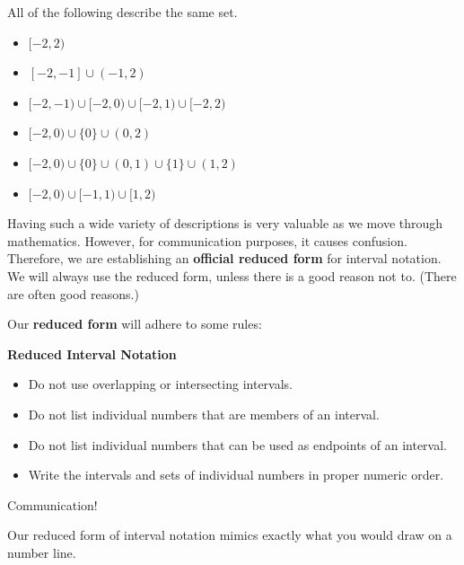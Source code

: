 \documentclass{ximera}
\begin{document}
\hfill\break

All of the following describe the same set.

\begin{itemize}
\item $[-2, 2)$
\item $[-2, -1] \cup (-1, 2)$
\item $[-2, -1) \cup [-2, 0) \cup [-2, 1) \cup [-2, 2)$
\item $[-2, 0) \cup \{ 0 \} \cup (0, 2)$
\item $[-2, 0) \cup \{ 0 \} \cup (0, 1) \cup \{ 1 \} \cup (1, 2)$
\item $[-2, 0) \cup [-1, 1) \cup [1, 2)$
\end{itemize}

Having such a wide variety of descriptions is very valuable as we move through mathematics.  However, for communication purposes, it causes confusion. Therefore, we are establishing an \textbf{official reduced form} for interval notation.  We will always use the reduced form, unless there is a good reason not to.  (There are often good reasons.)

Our \textbf{reduced form} will adhere to some rules:





\begin{notation} \textbf{\textcolor{red!50!green}{Reduced Interval Notation}} 

\begin{itemize}
\item Do not use overlapping or intersecting intervals.
\item Do not list individual numbers that are members of an interval.
\item Do not list individual numbers that can be used as endpoints of an interval.
\item Write the intervals and sets of individual numbers in proper numeric order.
\end{itemize}

\end{notation}
Communication!

Our reduced form of interval notation mimics exactly what you would draw on a number line.










\end{document}
